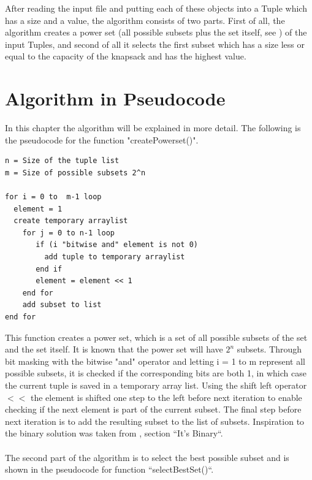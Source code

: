 \documentclass{inc/mas}
\begin{document}
After reading the input file and putting each of these objects into a Tuple which has a size and a value, the algorithm consists of two parts. First of all, the algorithm creates a power set (all possible subsets plus the set itself, see \citep{Gersting}) of the input Tuples, and second of all it selects the first subset which has a size less or equal to the capacity of the knapsack and has the highest value.\\
 

\section{Algorithm in Pseudocode}
In this chapter the algorithm will be explained in more detail. The following is the pseudocode for the function "createPowerset()". \newline

\begin{lstlisting}
n = Size of the tuple list 	
m = Size of possible subsets 2^n

for i = 0 to  m-1 loop
  element = 1  
  create temporary arraylist  
    for j = 0 to n-1 loop
       if (i "bitwise and" element is not 0)
         add tuple to temporary arraylist
       end if
       element = element << 1
    end for
    add subset to list
end for
\end{lstlisting}

\noindent This function creates a power set, which is a set of all possible subsets of the set and the set itself. It is known that the power set will have $2^n$ subsets. Through bit masking with the bitwise "and" operator and letting i = 1 to m represent all possible subsets, it is checked if the corresponding bits are both 1, in which case the current tuple is saved in a temporary array list. Using the shift left operator $<<$ the element is shifted one step to the left before next iteration to enable checking if the next element is part of the current subset. The final step before next iteration is to add the resulting subset to the list of subsets. Inspiration to the binary solution was taken from \citep{powerset}, section ``It's Binary``. \\ \\ 

The second part of the algorithm is to select the best possible subset and is shown in the pseudocode for function ``selectBestSet()``.\\
\end{document}
